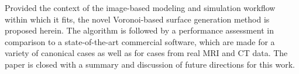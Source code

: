 %
Provided the context of the image-based modeling and simulation workflow within which it fits, the novel Voronoi-based surface generation method is proposed herein. The algorithm is followed by a performance assessment in comparison to a state-of-the-art commercial software, which are made for a variety of canonical cases as well as for cases from real MRI and CT data. The paper is closed with a summary and discussion of future directions for this work.
